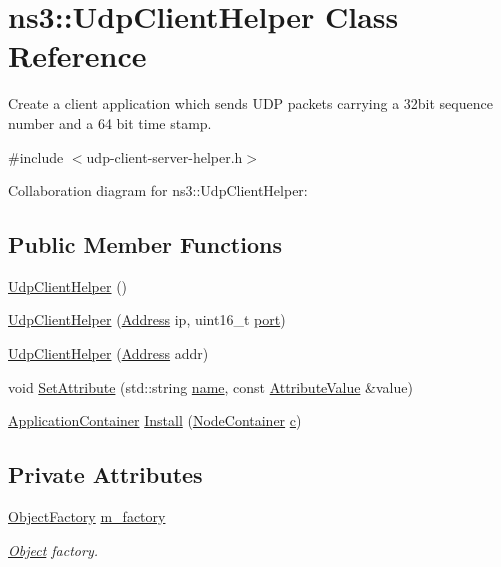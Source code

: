 \hypertarget{classns3_1_1UdpClientHelper}{}\section{ns3\+:\+:Udp\+Client\+Helper Class Reference}
\label{classns3_1_1UdpClientHelper}


Create a client application which sends U\+DP packets carrying a 32bit sequence number and a 64 bit time stamp.  




{\ttfamily \#include $<$udp-\/client-\/server-\/helper.\+h$>$}



Collaboration diagram for ns3\+:\+:Udp\+Client\+Helper\+:
\subsection*{Public Member Functions}
\begin{DoxyCompactItemize}
\item 
\hyperlink{classns3_1_1UdpClientHelper_adb545c818c57bac6970b7681e01ab267}{Udp\+Client\+Helper} ()
\item 
\hyperlink{classns3_1_1UdpClientHelper_a7f5eaa65b23aecc1985bcfd23404c9b1}{Udp\+Client\+Helper} (\hyperlink{classns3_1_1Address}{Address} ip, uint16\+\_\+t \hyperlink{visualizer-ideas_8txt_a21ff1c530daf8435e00048b7fc2c58e3}{port})
\item 
\hyperlink{classns3_1_1UdpClientHelper_ab1e6107dbc5d53ab0d5219ecea09a010}{Udp\+Client\+Helper} (\hyperlink{classns3_1_1Address}{Address} addr)
\item 
void \hyperlink{classns3_1_1UdpClientHelper_a8bbae16a28f85ab3f3b5aa4642edfeae}{Set\+Attribute} (std\+::string \hyperlink{generate__test__data__lte__spectrum__model_8m_ab74e6bf80237ddc4109968cedc58c151}{name}, const \hyperlink{classns3_1_1AttributeValue}{Attribute\+Value} \&value)
\item 
\hyperlink{classns3_1_1ApplicationContainer}{Application\+Container} \hyperlink{classns3_1_1UdpClientHelper_acf9d93eb6e852b77ac81cf61ba93deb0}{Install} (\hyperlink{classns3_1_1NodeContainer}{Node\+Container} \hyperlink{mmwave_2model_2fading-traces_2fading__trace__generator_8m_ae0323a9039add2978bf5b49550572c7c}{c})
\end{DoxyCompactItemize}
\subsection*{Private Attributes}
\begin{DoxyCompactItemize}
\item 
\hyperlink{classns3_1_1ObjectFactory}{Object\+Factory} \hyperlink{classns3_1_1UdpClientHelper_ac997ca60646b9887b7e68a6b06997879}{m\+\_\+factory}
\begin{DoxyCompactList}\small\item\em \hyperlink{classns3_1_1Object}{Object} factory. \end{DoxyCompactList}\end{DoxyCompactItemize}



